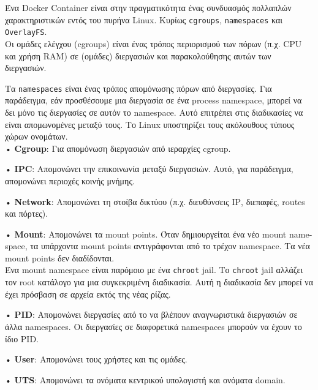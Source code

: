 Ένα \textlatin{Docker Container} είναι στην πραγματικότητα ένας συνδυασμός
πολλαπλών χαρακτηριστικών εντός του πυρήνα \textlatin{Linux}. Κυρίως 
\texttt{\textlatin{cgroups}}, \texttt{\textlatin{namespaces}} και 
\texttt{\textlatin{OverlayFS}}. \\

Οι ομάδες ελέγχου (\textlatin{cgroups}) είναι ένας τρόπος περιορισμού των
πόρων (π.χ. \textlatin{CPU} και χρήση \textlatin{RAM}) σε (ομάδες) διεργασιών
και παρακολούθησης αυτών των διεργασιών.

Τα \texttt{\textlatin{namespaces}} είναι ένας τρόπος απομόνωσης πόρων από
διεργασίες. Για παράδειγμα, εάν προσθέσουμε μια διεργασία σε ένα
\textlatin{process namespace}, μπορεί να δει μόνο τις διεργασίες
σε αυτόν το \textlatin{namespace}. Αυτό επιτρέπει στις διαδικασίες να είναι
απομωνομένες μεταξύ τους. Το \textlatin{Linux} υποστηρίζει τους ακόλουθους
τύπους χώρων ονομάτων. \\

• \textbf{\textlatin{Cgroup}}: Για απομόνωση διεργασιών από ιεραρχίες
\textlatin{cgroup}.

• \textbf{\textlatin{IPC}}: Απομονώνει την επικοινωνία μεταξύ διεργασιών.
Αυτό, για παράδειγμα, απομονώνει περιοχές κοινής μνήμης.

• \textbf{\textlatin{Network}}: Απομονώνει τη στοίβα δικτύου (π.χ. διευθύνσεις
\textlatin{IP}, διεπαφές, \textlatin{routes} και πόρτες).

• \textbf{\textlatin{Mount}}: Απομονώνει τα \textlatin{mount points}. Όταν
δημιουργείται ένα νέο \textlatin{mount namespace}, τα υπάρχοντα
\textlatin{mount points} αντιγράφονται από το τρέχον \textlatin{namespace}.
Τα νέα \textlatin{mount points} δεν διαδίδονται. \\

Ένα \textlatin{mount namespace} είναι παρόμοιο με ένα
\textlatin{\texttt{chroot} jail}. Το \textlatin{\texttt{chroot} jail}
αλλάζει τον \textlatin{root} κατάλογο για μια συγκεκριμένη διαδικασία.
Αυτή η διαδικασία δεν μπορεί να έχει πρόσβαση σε αρχεία εκτός της νέας ρίζας.

• \textbf{\textlatin{PID}}: Απομονώνει διεργασίες από το να βλέπουν
αναγνωριστικά διεργασιών σε άλλα \textlatin{namespaces}.
Οι διεργασίες σε διαφορετικά \textlatin{namespaces} μπορούν να έχουν το ίδιο
\textlatin{PID}.

• \textbf{\textlatin{User}}: Απομονώνει τους χρήστες και τις ομάδες.

• \textbf{\textlatin{UTS}}: Απομονώνει τα ονόματα κεντρικού υπολογιστή και
ονόματα \textlatin{domain}. \\

